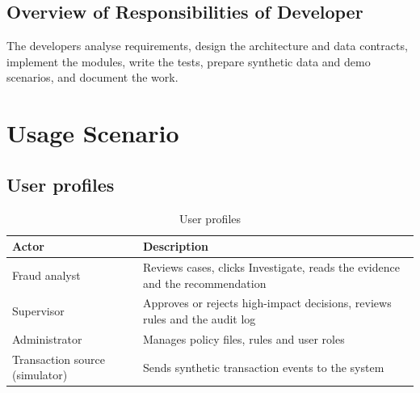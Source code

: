 \documentclass[oneside,a4paper,12pt]{report}
\begin{document}
\subsection{Overview of Responsibilities of Developer}
The developers analyse requirements, design the architecture and data contracts, implement the modules, write the tests, prepare synthetic data and demo scenarios, and document the work.

\section{Usage Scenario}
\subsection{User profiles}
\begin{table}[H]
\centering
\begin{tabularx}{\textwidth}{|l|X|}
\hline
\textbf{Actor} & \textbf{Description} \\ \hline
Fraud analyst & Reviews cases, clicks Investigate, reads the evidence and the recommendation \\ \hline
Supervisor & Approves or rejects high-impact decisions, reviews rules and the audit log \\ \hline
Administrator & Manages policy files, rules and user roles \\ \hline
Transaction source (simulator) & Sends synthetic transaction events to the system \\ \hline
\end{tabularx}
\caption{User profiles}
\end{table}
\end{document}

